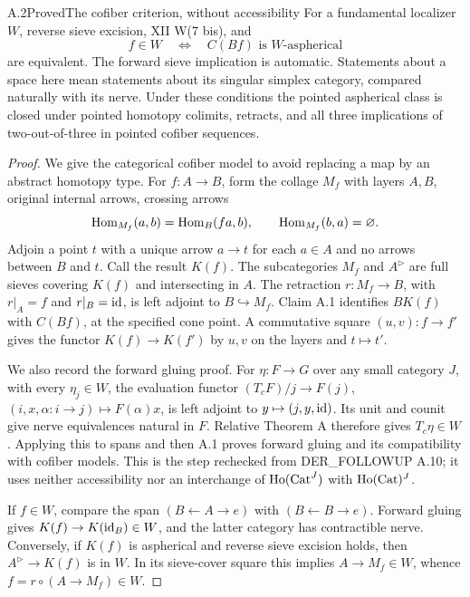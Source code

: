 \begin{claim}{A.2}{Proved}{The cofiber criterion, without accessibility}\label{A2}
For a fundamental localizer $W$, reverse sieve excision, XII W(7 bis), and
\[
 f\in W\quad\Longleftrightarrow\quad C(Bf)\text{ is }W\text{-aspherical}
 \tag{A.2.1}
\]
are equivalent. The forward sieve implication is automatic. Statements about a space here mean statements about its singular simplex category, compared naturally with its nerve. Under these conditions the pointed aspherical class is closed under pointed homotopy colimits, retracts, and all three implications of two-out-of-three in pointed cofiber sequences.
\end{claim}
\begin{proof}
We give the categorical cofiber model to avoid replacing a map by an abstract homotopy type. For $f:A\to B$, form the collage $M_f$ with layers $A,B$, original internal arrows, crossing arrows
\[
 \operatorname{Hom}_{M_f}(a,b)=\operatorname{Hom}_B(fa,b),\qquad
 \operatorname{Hom}_{M_f}(b,a)=\varnothing.
\]
Adjoin a point $t$ with a unique arrow $a\to t$ for each $a\in A$ and no arrows between $B$ and $t$. Call the result $K(f)$. The subcategories $M_f$ and $A^{\triangleright}$ are full sieves covering $K(f)$ and intersecting in $A$. The retraction $r:M_f\to B$, with $r|_A=f$ and $r|_B=\operatorname{id}$, is left adjoint to $B\hookrightarrow M_f$. Claim A.1 identifies $BK(f)$ with $C(Bf)$, at the specified cone point. A commutative square $(u,v):f\to f'$ gives the functor $K(f)\to K(f')$ by $u,v$ on the layers and $t\mapsto t'$.

We also record the forward gluing proof. For $\eta:F\to G$ over any small category $J$, with every $\eta_j\in W$, the evaluation functor $(T_cF)/j\to F(j)$, $(i,x,\alpha:i\to j)\mapsto F(\alpha)x$, is left adjoint to $y\mapsto(j,y,\operatorname{id})$. Its unit and counit give nerve equivalences natural in $F$. Relative Theorem A therefore gives $T_c\eta\in W$. Applying this to spans and then A.1 proves forward gluing and its compatibility with cofiber models. This is the step rechecked from DER\_FOLLOWUP A.10; it uses neither accessibility nor an interchange of $\mathrm{Ho}(\mathrm{Cat}^J)$ with $\mathrm{Ho}(\mathrm{Cat})^J$.

If $f\in W$, compare the span $(B\leftarrow A\to e)$ with $(B\leftarrow B\to e)$. Forward gluing gives $K(f)\to K(\operatorname{id}_B)\in W$, and the latter category has contractible nerve. Conversely, if $K(f)$ is aspherical and reverse sieve excision holds, then $A^{\triangleright}\to K(f)$ is in $W$. In its sieve-cover square this implies $A\to M_f\in W$, whence $f=r\circ(A\to M_f)\in W$.


\end{proof}
